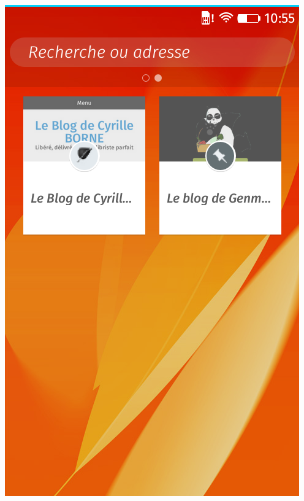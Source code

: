 \documentclass{beamer}
\begin{document}
\begin{frame}
\begin{center}
\begin{columns}[t]
\begin{column}{5cm}
\includegraphics[scale=0.25] {./images/FFOS_Favori.png} 
\end{column}
\end{columns}  
\end{center}
\end{frame}
\end{document}
